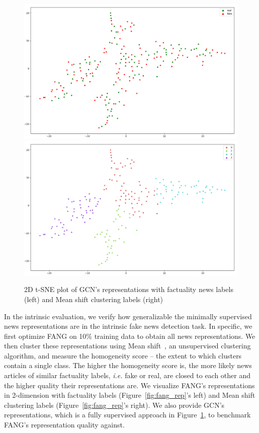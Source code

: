 \documentclass[fyp]{socreport}
\theoremstyle{definition}
\theoremstyle{hypothesis}
\begin{document}
\begin{figure}[ht]
\centering
\includegraphics[scale=0.23]{gcn_tsne.png}
\includegraphics[scale=0.23]{gcn_clusters.png}\\
\caption{2D t-SNE plot of GCN's representations with factuality news labels (left) and Mean shift clustering labels (right)}
\label{fig:gcn_rep}
\end{figure}

In the intrinsic evaluation, we verify how generalizable the minimally supervised news representations are in the intrinsic fake news detection task. In specific, we first optimize FANG on 10\% training data to obtain all news representations. We then cluster these representations using Mean shift~\cite{Comaniciu2002meanshift}, an unsupervised clustering algorithm, and measure the homogeneity score -- the extent to which clusters contain a single class. The higher the homogeneity score is, the more likely news articles of similar factuality labels, \textit{i.e.} fake or real, are closed to each other and the higher quality their representations are. We visualize FANG's representations in 2-dimension with factuality labels (Figure~\ref{fig:fang_rep}'s left) and Mean shift clustering labels (Figure~\ref{fig:fang_rep}'s right). We also provide GCN's representations, which is a fully supervised approach in Figure~\ref{fig:gcn_rep}, to benchmark FANG's representation quality against.
\end{document}
